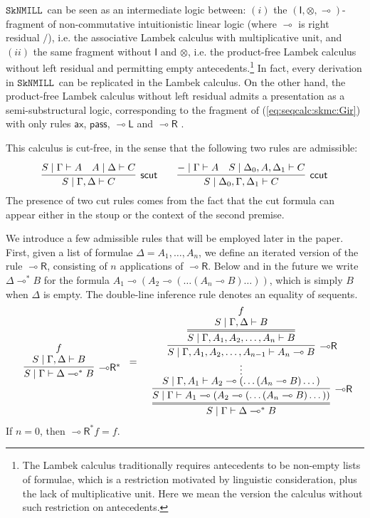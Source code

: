 \documentclass[sn-mathphys-num]{sn-jnl}%
\newcommand{\GG}{\Gamma}
\newcommand{\GD}{\Delta}
\newcommand{\vd}{\vdash}
\newcommand{\pass}{\mathsf{pass}}
\newcommand{\ax}{\mathsf{ax}}
\newcommand{\ot}{\otimes}
\newcommand{\lolli}{\multimap}
\newcommand{\lleft}{{\lolli}\mathsf{L}}
\newcommand{\lright}{{\lolli}\mathsf{R}}
\newcommand{\unit}{\mathsf{I}}
\newcommand{\sls}{\slash}
\newcommand{\proofbox}[1]{\begin{tabular}{l} #1 \end{tabular}}
\newcommand{\SkNMILL}{$\mathtt{SkNMILL}$}
\newcommand{\niccolo}[1]{\textcolor{red}{NV: #1}}
\theoremstyle{thmstyleone}%
\theoremstyle{thmstyletwo}%
\theoremstyle{thmstylethree}%
\begin{document}
\SkNMILL~can be seen as an intermediate logic between: $(i)$ the $(\unit,\ot,\lolli)$-fragment of non-commutative intuitionistic linear logic (where $\lolli$ is right residual $\sls$), i.e. the associative Lambek calculus with multiplicative unit, and $(ii)$ the same fragment without $\unit$ and $\ot$, i.e. the product-free Lambek calculus
without left residual and permitting empty antecedents.\footnote{The Lambek calculus traditionally requires antecedents to be non-empty lists of formulae, which is a restriction motivated by linguistic consideration, plus the lack of multiplicative unit. Here we mean the version the calculus without such restriction on antecedents.}
In fact, every derivation in \SkNMILL~can be replicated in the Lambek calculus.
On the other hand, the product-free Lambek calculus without left residual admits a presentation as a semi-substructural logic, corresponding to the fragment of (\ref{eq:seqcalc:skmc:Gir}) with only rules $\ax$, $\pass$, $\lleft$ and $\lright$ \cite{uustalu:deductive:nodate}.


This calculus is cut-free, in the sense that the following two rules are admissible:
\begin{equation}\label{eq:cut}
  \infer[\mathsf{scut}]{S \mid \GG , \GD \vd C}{
  \deduce{S \mid \GG \vd A}{}
  &
  \deduce{A \mid \GD \vd C}{}
  }
  \qquad
  \infer[\mathsf{ccut}]{S \mid \GD_0 , \GG , \GD_1 \vd C}{
  \deduce{{-} \mid \GG \vd A}{}
  &
  \deduce{S \mid \GD_0 , A , \GD_1 \vd C}{}
  }
\end{equation}
The presence of two cut rules comes from the fact that the cut formula can appear either in the stoup or the context of the second premise.


We introduce a few admissible rules that will be employed later in the paper.
First, given a list of formulae $\GD = A_1,\dots,A_n$, we define an iterated version of the rule $\lright$, consisting of $n$ applications of $\lright$. Below and in the future we write $\GD \lolli^* B$ for the formula $A_1 \lolli (A_2 \lolli (\dots (A_n \lolli B) \dots ))$, which is simply $B$ when $\GD$ is empty. The double-line inference rule denotes an equality of sequents.
\begin{equation}\label{-oR*}
  \begin{array}{l}
    \proofbox{\infer[\lright^*]{S \mid \GG \vd \GD \lolli^* B}{
    \deduce{S \mid \GG , \GD \vd B}{f}
    }}
    =
    \proofbox{
    \infer={S \mid \GG \vd \GD \lolli^* B}{
    \infer[\lright]{S \mid \GG \vd A_1 \lolli (A_2 \lolli (\dots (A_n \lolli B) \dots ))}{
    \deduce[\vdots]{S \mid \GG, A_1 \vd A_2 \lolli (\dots (A_n \lolli B) \dots )}{
    \infer[\lright]{S \mid \GG , A_1, A_2, \dots, A_{n-1} \vd A_n \lolli B}{
    \infer={S \mid \GG , A_1, A_2, \dots, A_n \vd B}{
    \deduce{S \mid \GG , \GD \vd B}{f}
    }
    }
    }
    }
    }
    }
  \end{array}
\end{equation}
If $n = 0$, then $\lright^* f = f$.
\end{document}
